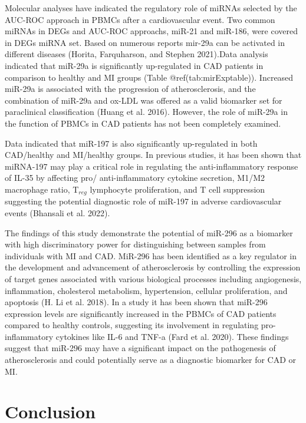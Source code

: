 \documentclass[smallextended]{svjour3}       %
\begin{document}
Molecular analyses have indicated the regulatory role of miRNAs selected
by the AUC-ROC approach in PBMCs after a cardiovascular event. Two
common miRNAs in DEGs and AUC-ROC approachs, miR-21 and miR-186, were
covered in DEGs miRNA set. Based on numerous reports mir-29a can be
activated in different diseases (Horita, Farquharson, and Stephen
2021).Data analysis indicated that miR-29a is significantly up-regulated
in CAD patients in comparison to healthy and MI groups (Table
@ref(tab:mirExptable)). Increased miR-29a is associated with the
progression of atherosclerosis, and the combination of miR-29a and
ox-LDL was offered as a valid biomarker set for paraclinical
classification (Huang et al. 2016). However, the role of miR-29a in the
function of PBMCs in CAD patients has not been completely examined.

Data indicated that miR-197 is also significantly up-regulated in both
CAD/healthy and MI/healthy groups. In previous studies, it has been
shown that miRNA-197 may play a critical role in regulating the
anti-inflammatory response of IL-35 by affecting pro/ anti-inflammatory
cytokine secretion, M1/M2 macrophage ratio, T\(_{reg}\) lymphocyte
proliferation, and T cell suppression suggesting the potential
diagnostic role of miR-197 in adverse cardiovascular events (Bhansali et
al. 2022).

The findings of this study demonstrate the potential of miR-296 as a
biomarker with high discriminatory power for distinguishing between
samples from individuals with MI and CAD. MiR-296 has been identified as
a key regulator in the development and advancement of atherosclerosis by
controlling the expression of target genes associated with various
biological processes including angiogenesis, inflammation, cholesterol
metabolism, hypertension, cellular proliferation, and apoptosis (H. Li
et al. 2018). In a study it has been shown that miR-296 expression
levels are significantly increased in the PBMCs of CAD patients compared
to healthy controls, suggesting its involvement in regulating
pro-inflammatory cytokines like IL-6 and TNF-a (Fard et al. 2020). These
findings suggest that miR-296 may have a significant impact on the
pathogenesis of atherosclerosis and could potentially serve as a
diagnostic biomarker for CAD or MI.

\hypertarget{conclusion}{%
\section{Conclusion}\label{conclusion}}
\end{document}
